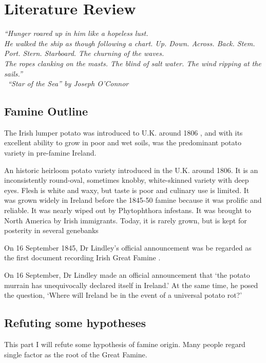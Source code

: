 \chapter{Literature Review}

\textit{``Hunger roared up in him like a hopeless lust.\\ 
He walked the ship as though following a chart. Up. Down. Across. Back. Stem. Port. Stern. Starboard. The churning of the waves. \\
The ropes clanking on the masts. The blind of salt water. The wind ripping at the sails.''\\
\textemdash\ ``Star of the Sea'' by Joseph O'Connor}
\vspace{.2cm}

\section{Famine Outline}

The Irish lumper potato was introduced to U.K. around 1806 \citep{tucker2016potato}, and with its excellent ability to grow in poor and wet soils, was the predominant potato variety in pre-famine Ireland. 


An historic heirloom potato variety introduced in the U.K. around 1806. It is an
inconsistently round-oval, sometimes knobby, white-skinned variety with deep eyes. Flesh
is white and waxy, but taste is poor and culinary use is limited. It was grown widely in
Ireland before the 1845-50 famine because it was prolific and reliable. It was nearly
wiped out by Phytophthora infestans. It was brought to North America by Irish
immigrants. Today, it is rarely grown, but is kept for posterity in several genebanks

On 16 September 1845, Dr Lindley's official announcement was be regarded as the first document recording Irish Great Famine \citep{kelly1995great}.

On 16 September, Dr Lindley made an official announcement
that ‘the potato murrain has unequivocally declared itself in Ireland.’ At the same
time, he posed the question, ‘Where will Ireland be in the event of a universal potato
rot?’



\section{Refuting some hypotheses}

This part I will refute some hypothesis of famine origin. Many people regard single factor as the root of the Great Famine.

